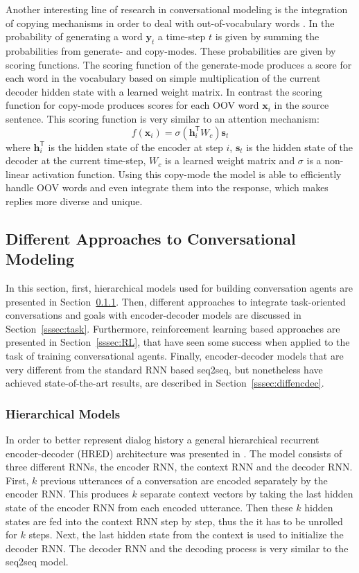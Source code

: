 \documentclass[12pt]{article}
\begin{document}
Another interesting line of research in conversational modeling is the integration of copying mechanisms in order to deal with out-of-vocabulary words \cite{Eric:2017,Gu:2016}. In \cite{Gu:2016} the probability of generating a word \(\bm{y}_t\) a time-step \(t\) is given by summing the probabilities from generate- and copy-modes. These probabilities are given by scoring functions. The scoring function of the generate-mode produces a score for each word in the vocabulary based on simple multiplication of the current decoder hidden state with a learned weight matrix. In contrast the scoring function for copy-mode produces scores for each OOV word \(\bm{x}_i\) in the source sentence. This scoring function is very similar to an attention mechanism:
\begin{equation}
f(\bm{x}_i)=\sigma(\bm{h}_{i}^{\mathsf{T}}W_c)\bm{s}_t
\end{equation}
where \(\bm{h}_{i}^{\mathsf{T}}\) is the hidden state of the encoder at step \(i\), \(\bm{s}_t\) is the hidden state of the decoder at the current time-step, \(W_c\) is a learned weight matrix and \(\sigma\) is a non-linear activation function. Using this copy-mode the model is able to efficiently handle OOV words and even integrate them into the response, which makes replies more diverse and unique.

\subsection{Different Approaches to Conversational Modeling} \label{ssec:33}
In this section, first, hierarchical models used for building conversation agents are presented in Section~\ref{sssec:HRED}. Then, different approaches to integrate task-oriented conversations and goals with encoder-decoder models are discussed in Section~\ref{sssec:task}. Furthermore, reinforcement learning based approaches are presented in Section~\ref{sssec:RL}, that have seen some success when applied to the task of training conversational agents. Finally, encoder-decoder models that are very different from the standard RNN based seq2seq, but nonetheless have achieved state-of-the-art results, are described in Section~\ref{sssec:diffencdec}.

\subsubsection{Hierarchical Models} \label{sssec:HRED}
In order to better represent dialog history a general hierarchical recurrent encoder-decoder (HRED) architecture was presented in \cite{Serban:2015}. The model consists of three different RNNs, the encoder RNN, the context RNN and the decoder RNN. First, \(k\) previous utterances of a conversation are encoded separately by the encoder RNN. This produces \(k\) separate context vectors by taking the last hidden state of the encoder RNN from each encoded utterance. Then these \(k\) hidden states are fed into the context RNN step by step, thus the it has to be unrolled for \(k\) steps. Next, the last hidden state from the context is used to initialize the decoder RNN. The decoder RNN and the decoding process is very similar to the seq2seq model.
\end{document}
